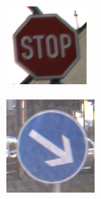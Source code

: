 \begin{figure}[H]
   \centering
   \begin{subfigure}[b]{0.2\textwidth}
       \centering
       \includegraphics[height=\textwidth]{../images/GTSRB/00093.png}
       \caption{}
       \label{fig:gtrsb-paper-bsp-image-1}
   \end{subfigure}
   \hspace{2em}%
   \begin{subfigure}[b]{0.2\textwidth}
       \centering
       \includegraphics[height=\textwidth]{../images/GTSRB/00847.png}

\end{subfigure}
\end{figure}
